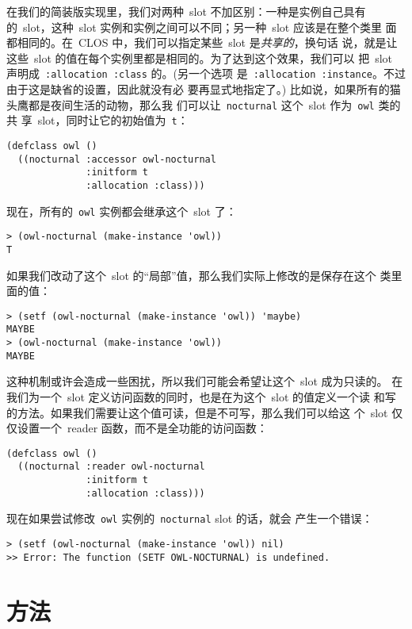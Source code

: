 在我们的简装版实现里，我们对两种~slot 不加区别：一种是实例自己具有
的~slot，这种~slot 实例和实例之间可以不同；另一种~slot 应该是在整个类里
面都相同的。在~CLOS 中，我们可以指定某些~slot 是\emph{共享的}，换句话
说，就是让这些~slot 的值在每个实例里都是相同的。为了达到这个效果，我们可以
把~slot 声明成~\texttt{:allocation :class} 的。(另一个选项
是~\texttt{:allocation :instance}。不过由于这是缺省的设置，因此就没有必
要再显式地指定了。) 比如说，如果所有的猫头鹰都是夜间生活的动物，那么我
们可以让~\texttt{nocturnal} 这个~slot 作为~\texttt{owl} 类的共
享~slot，同时让它的初始值为~\texttt{t}：
\begin{lstlisting}
(defclass owl ()
  ((nocturnal :accessor owl-nocturnal
              :initform t
              :allocation :class)))
\end{lstlisting}
现在，所有的~\texttt{owl} 实例都会继承这个~slot 了：
\begin{lstlisting}
> (owl-nocturnal (make-instance 'owl))
T
\end{lstlisting}
如果我们改动了这个~slot 的``局部''值，那么我们实际上修改的是保存在这个
类里面的值：
\begin{lstlisting}
> (setf (owl-nocturnal (make-instance 'owl)) 'maybe)
MAYBE
> (owl-nocturnal (make-instance 'owl))
MAYBE
\end{lstlisting}

这种机制或许会造成一些困扰，所以我们可能会希望让这个~slot 成为只读的。
在我们为一个~slot 定义访问函数的同时，也是在为这个~slot 的值定义一个读
和写的方法。如果我们需要让这个值可读，但是不可写，那么我们可以给这
个~slot 仅仅设置一个~reader 函数，而不是全功能的访问函数：
\begin{lstlisting}
(defclass owl ()
  ((nocturnal :reader owl-nocturnal
              :initform t
              :allocation :class)))
\end{lstlisting}
现在如果尝试修改~\texttt{owl} 实例的~\texttt{nocturnal} slot 的话，就会
产生一个错误：
\begin{lstlisting}
> (setf (owl-nocturnal (make-instance 'owl)) nil)
>> Error: The function (SETF OWL-NOCTURNAL) is undefined.
\end{lstlisting}

\section{方法}
\label{sec:methods}

